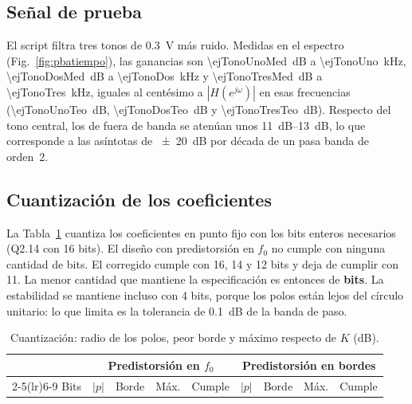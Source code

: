 \subsection{Señal de prueba}
El script filtra tres tonos de \SI{0,3}{\volt} más ruido. Medidas en el espectro (Fig.~\ref{fig:pbatiempo}), las ganancias son \SI{\ejTonoUnoMed}{\dB} a \SI{\ejTonoUno}{\kilo\hertz}, \SI{\ejTonoDosMed}{\dB} a \SI{\ejTonoDos}{\kilo\hertz} y \SI{\ejTonoTresMed}{\dB} a \SI{\ejTonoTres}{\kilo\hertz}, iguales al centésimo a $|H(e^{j\omega})|$ en esas frecuencias (\SI{\ejTonoUnoTeo}{\dB}, \SI{\ejTonoDosTeo}{\dB} y \SI{\ejTonoTresTeo}{\dB}). Respecto del tono central, los de fuera de banda se atenúan unos \SIrange{11}{13}{\dB}, lo que corresponde a las asíntotas de \SI{\pm 20}{\dB} por década de un pasa banda de orden~2.

\subsection{Cuantización de los coeficientes}
La Tabla~\ref{tab:bits} cuantiza los coeficientes en punto fijo con los bits enteros necesarios (Q2.14 con 16 bits). El diseño con predistorsión en $f_0$ no cumple con ninguna cantidad de bits. El corregido cumple con 16, 14 y 12 bits y deja de cumplir con 11. La menor cantidad que mantiene la especificación es entonces de \textbf{\ejMinBits{} bits}. La estabilidad se mantiene incluso con 4 bits, porque los polos están lejos del círculo unitario: lo que limita es la tolerancia de \SI{0,1}{\dB} de la banda de paso.

\begin{table}[!htb]
\centering
\caption{Cuantización: radio de los polos, peor borde y máximo respecto de $K$ (dB).}
\label{tab:bits}
\footnotesize
\setlength{\tabcolsep}{2.6pt}
\begin{tabular}{ccccccccc}
\toprule
& \multicolumn{4}{c}{Predistorsión en $f_0$} & \multicolumn{4}{c}{Predistorsión en bordes} \\
\cmidrule(lr){2-5}\cmidrule(lr){6-9}
Bits & $|p|$ & Borde & Máx. & Cumple & $|p|$ & Borde & Máx. & Cumple \\
\midrule

\end{tabular}
\end{table}
